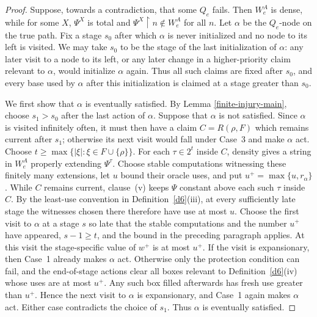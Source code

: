 \documentclass[10pt,a4paper]{amsart}
\begin{document}
\begin{proof}
Suppose, towards a contradiction, that some $Q_e$ fails.  Then $W_e^A$ is
dense, while for some $X$, $\Psi^X$ is total and $\Psi^X\upharpoonright n\notin W_e^A$ for all $n$.
Let $\alpha$ be the $Q_e$-node on the true path.  Fix a stage $s_0$ after
which $\alpha$ is never initialized and no node to its left is visited.  We
may take $s_0$ to be the stage of the last initialization of $\alpha$: any
later visit to a node to its left, or any later change in a higher-priority
claim relevant to $\alpha$, would initialize $\alpha$ again.  Thus all such
claims are fixed after $s_0$, and every base used by $\alpha$ after this
initialization is claimed at a stage greater than $s_0$.

We first show that $\alpha$ is eventually satisfied.  By Lemma
\ref{finite-injury-main}, choose $s_1>s_0$ after the last action of $\alpha$.
Suppose that $\alpha$ is not satisfied.  Since $\alpha$ is visited infinitely
often, it must then have a claim $C=R(\rho,F)$ which remains current after
$s_1$; otherwise its next visit would fall under Case~3 and make $\alpha$ act.
Choose $t\geq\max\{|\xi|:\xi\in F\cup\{\rho\}\}$.
For each $\tau\in2^t$ inside $C$, density gives a string in $W_e^A$ properly
extending $\Psi^\tau$.  Choose stable computations witnessing these finitely
many extensions, let $u$ bound their oracle uses, and put
$u^+=\max\{u,r_\alpha\}$.  While $C$ remains current, clause~(v) keeps $\Psi$
constant above each such $\tau$ inside $C$.  By the least-use convention in
Definition~\ref{d6}(iii), at every sufficiently late stage the witnesses
chosen there therefore have use at most $u$.
Choose the first visit to $\alpha$ at a stage $s$ so late that the stable
computations and the number $u^+$ have appeared, $s-1\geq t$, and the bound in
the preceding paragraph applies.  At this visit the stage-specific value of
$w^+$ is at most $u^+$.  If the visit is expansionary, then Case~1 already makes
$\alpha$ act.  Otherwise only the protection condition can fail, and the
end-of-stage actions clear all boxes relevant to Definition~\ref{d6}(iv) whose
uses are at most $u^+$.  Any such box filled afterwards has fresh use greater
than $u^+$.  Hence the next visit to $\alpha$ is expansionary, and Case~1 again
makes $\alpha$ act.  Either case contradicts the choice of $s_1$.  Thus
$\alpha$ is eventually satisfied.


\end{proof}
\end{document}
